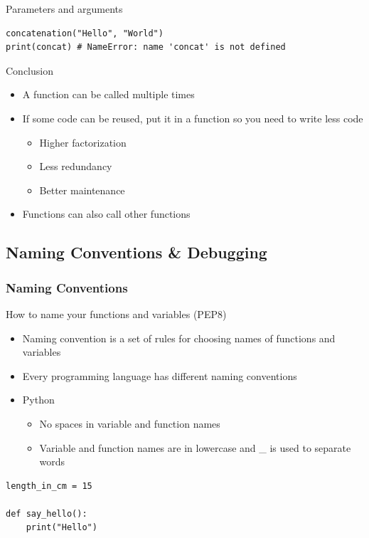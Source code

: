 \documentclass[10pt, a4paper]{beamer} %
\begin{document}
\begin{frame}
\begin{block}{Parameters and arguments}
\begin{lstlisting}
concatenation("Hello", "World")
print(concat) # NameError: name 'concat' is not defined
    \end{lstlisting}
\end{block}
\begin{block}{Conclusion}
    \begin{itemize}
        \item A function can be called multiple times
        \item If some code can be reused, put it in a function so you need to write less code
        \begin{itemize}
            \item Higher factorization
            \item Less redundancy
            \item Better maintenance
        \end{itemize}
        \item Functions can also call other functions
    \end{itemize}
\end{block}
\end{frame}

\subsection{Naming Conventions \& Debugging} %
\label{sub:naming_conventions_&_debugging}
\begin{frame}\frametitle{Naming Conventions}
\begin{block}{How to name your functions and variables (PEP8)}
    \begin{itemize}
\item Naming convention is a set of rules for choosing names of functions and variables
\item Every programming language has different naming conventions
\item Python
\begin{itemize}
    \item No spaces in variable and function names
    \item Variable and function names are in lowercase and \_ is used to separate words
\end{itemize}
    \end{itemize}

\begin{lstlisting}
length_in_cm = 15

def say_hello():
    print("Hello")    
\end{lstlisting}
\end{block}
\end{frame}
\end{document}
